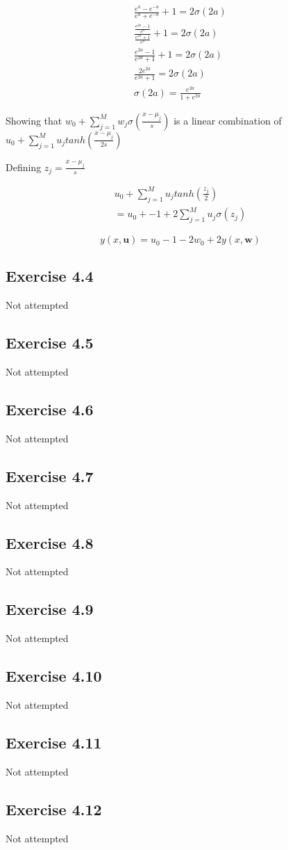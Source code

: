 \begin{gather}
  \frac{e^a-e^{-a}}{e^a+e^{-a}} +1 = 2\sigma(2a) \\
  \frac{\frac{e^{2a} -1}{e^a} }{\frac{e^{2a} +1}{e^a}} +1 =2\sigma(2a) \\
  \frac{e^{2a}-1}{e^{2a}+1} + 1 = 2\sigma(2a) \\
  \frac{2e^{2a}}{e^{2a}+1} = 2\sigma(2a) \\
  \sigma(2a) = \frac{e^{2a}}{1+e^{2a}}
\end{gather}


Showing that $w_0 + \sum_{j=1}^{M}w_j\sigma(\frac{x-\mu_j}{s}) $ is a linear combination of $ u_0 + \sum_{j=1}^{M}u_j tanh(\frac{x-\mu_j}{2s})$

Defining $z_j = \frac{x-\mu_j}{s}$

\begin{gather}
  u_0 + \sum_{j=1}^{M}u_j tanh(\frac{z_j}{2}) \\ 
  = u_0 + -1 + 2\sum_{j=1}^{M}u_j \sigma(z_j)
\end{gather}

\begin{equation}
  y(x,\mathbf{u}) = u_0 -1 -2w_0 + 2y(x,\mathbf{w}) 
\end{equation}


\subsection{Exercise 4.4}
Not attempted

\subsection{Exercise 4.5}
Not attempted

\subsection{Exercise 4.6}
Not attempted

\subsection{Exercise 4.7}
Not attempted

\subsection{Exercise 4.8}
Not attempted

\subsection{Exercise 4.9}
Not attempted

\subsection{Exercise 4.10}
Not attempted

\subsection{Exercise 4.11}
Not attempted

\subsection{Exercise 4.12}
Not attempted

